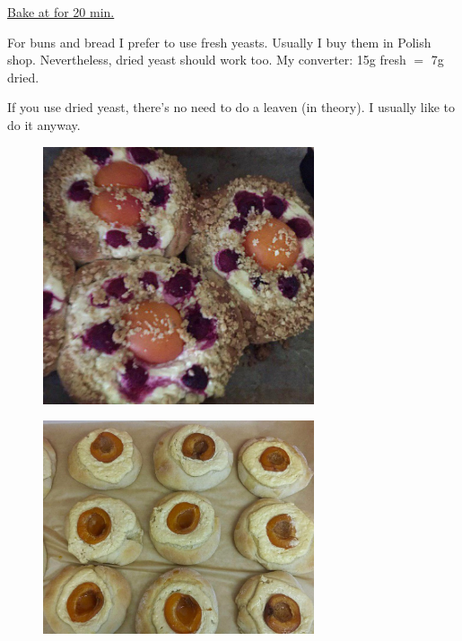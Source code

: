 \begin{recipe}
{        \step \underline{Bake at \unit[180]{\textcelcius} for 20 min.}
        \vspace{2cm}
    }

    \suggestion
    {%
        For buns and bread I prefer to use fresh yeasts.
        Usually I buy them in Polish shop.
        Nevertheless, dried yeast should work too.
        My converter: 15g fresh $=$ 7g dried.

        If you use dried yeast, there's no need to do a leaven (in theory).
        I usually like to do it anyway.
    }


\end{recipe}

\begin{figure}[h]
    \centering
    \includegraphics[width=8cm]{pic/buns_apricot_quark}
\end{figure}

\begin{figure}[h]
    \centering
    \includegraphics[width=8cm]{pic/buns_apricot}
\end{figure}
